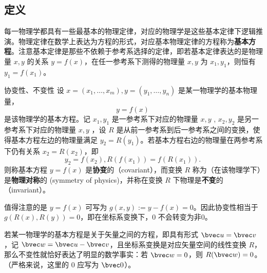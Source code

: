 \subsection{定义}
每一物理学都具有一些最基本的物理定律，对应的物理学是这些基本定律下逻辑推演。物理定律在数学上表达为方程的形式，对应基本物理定律的方程称为\textbf{基本方程}。注意基本定律是那些不依赖于参考系选择的定律，即若基本定律表达的是物理量 $x,y$ 的关系 $y=f(x)$，在任一参考系下测得的物理量 $x,y$ 为 $x_1,y_1$，则恒有 $y_1=f(x_1)$。
\begin{definition}{协变性、不变性}\label{def_CoIn_1}
设 $x=(x_1,\ldots,x_m),y=(y_1,\ldots,y_n)$ 是某一物理学的基本物理量，
\begin{equation}
y=f(x)~
\end{equation}
是该物理学的基本方程。记 $x_1,y_1$ 是一参考系下对应的物理量 $x,y$ , $x_2,y_2$ 是另一参考系下对应的物理量 $x,y$ ，设 $R$ 是从前一参考系到后一参考系之间的变换，使得基本方程左边的物理量满足 $y_2=R(y_1)$。若基本方程右边的物理量在两参考系下仍有关系 $x_2=R(x_2)$，即
\begin{equation}
y_2=f(x_2),R(f(x_1))=f(R(x_1)).~
\end{equation}
则称基本方程 $y=f(x)$ 是\textbf{协变}的（covariant），而变换 $R$ 称为（在该物理学下）是\textbf{物理对称}的 (symmetry of physics)，并称在变换 $R$ 下物理是\textbf{不变}的（invariant）。
\end{definition}

值得注意的是 $y=f(x)$ 可写为 $g(x,y):=y-f(x)=0$。因此协变性相当于 $g(R(x),R(y))=0$，即在坐标系变换下，$0$ 不会转变为非0。
\begin{example}{}
若某一物理学的基本方程是关于矢量之间的方程，即具有形式 $\bvec u=\bvec v$，记 $\bvec w=\bvec u-\bvec v$，且坐标系变换是对应矢量空间的线性变换 $R$，那么不变性就恰好表达了明显的数学事实：若 $\bvec w=0$，则 $R(\bvec w)=0$。（严格来说，这里的 0 应写为 $\bvec 0$）。
\end{example}














